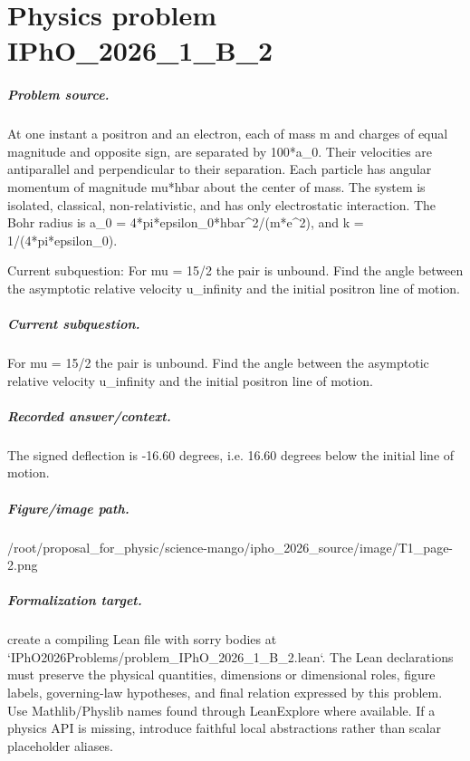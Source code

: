 
\chapter{Physics problem IPhO\_2026\_1\_B\_2}
\label{ch:IPhO2026Problems_problem_IPhO_2026_1_B_2}

\paragraph{Problem source.}
At one instant a positron and an electron, each of mass m and charges of equal
magnitude and opposite sign, are separated by 100*a\_0.  Their velocities are
antiparallel and perpendicular to their separation.  Each particle has angular
momentum of magnitude mu*hbar about the center of mass.  The system is isolated,
classical, non-relativistic, and has only electrostatic interaction.  The Bohr
radius is a\_0 = 4*pi*epsilon\_0*hbar\textasciicircum{}2/(m*e\textasciicircum{}2), and k = 1/(4*pi*epsilon\_0).

Current subquestion:
For mu = 15/2 the pair is unbound. Find the angle between the asymptotic relative velocity u\_infinity and the initial positron line of motion.

\paragraph{Current subquestion.}
For mu = 15/2 the pair is unbound. Find the angle between the asymptotic relative velocity u\_infinity and the initial positron line of motion.

\paragraph{Recorded answer/context.}
The signed deflection is -16.60 degrees, i.e. 16.60 degrees below the initial line of motion.

\paragraph{Figure/image path.}
/root/proposal\_for\_physic/science-mango/ipho\_2026\_source/image/T1\_page-2.png

\paragraph{Formalization target.}
create a compiling Lean file with sorry bodies at `IPhO2026Problems/problem\_IPhO\_2026\_1\_B\_2.lean`. The Lean declarations must preserve the physical quantities, dimensions or dimensional roles, figure labels, governing-law hypotheses, and final relation expressed by this problem.
Use Mathlib/Physlib names found through LeanExplore where available. If a physics API is missing, introduce faithful local abstractions rather than scalar placeholder aliases.

